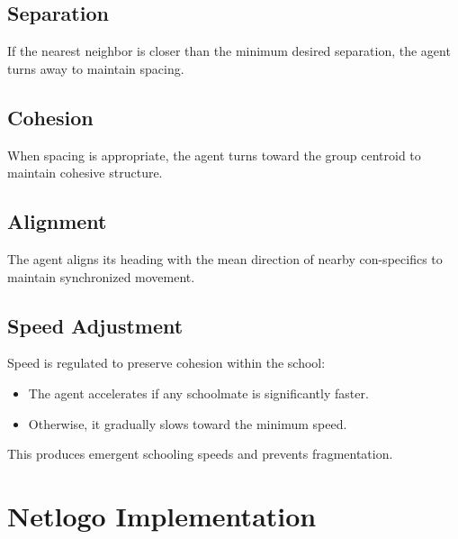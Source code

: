 \documentclass[
]{book}
\providecommand{\tightlist}{%
  \setlength{\itemsep}{0pt}\setlength{\parskip}{0pt}}
\begin{document}
\subsection{Separation}\label{separation}

If the nearest neighbor is closer than the minimum desired separation, the agent turns away to maintain spacing.

\subsection{Cohesion}\label{cohesion}

When spacing is appropriate, the agent turns toward the group centroid to maintain cohesive structure.

\subsection{Alignment}\label{alignment}

The agent aligns its heading with the mean direction of nearby con-specifics to maintain synchronized movement.

\subsection{Speed Adjustment}\label{speed-adjustment}

Speed is regulated to preserve cohesion within the school:

\begin{itemize}
\tightlist
\item
  The agent accelerates if any schoolmate is significantly faster.\\
\item
  Otherwise, it gradually slows toward the minimum speed.
\end{itemize}

This produces emergent schooling speeds and prevents fragmentation.

\section{Netlogo Implementation}\label{netlogo-implementation-9}
\end{document}
